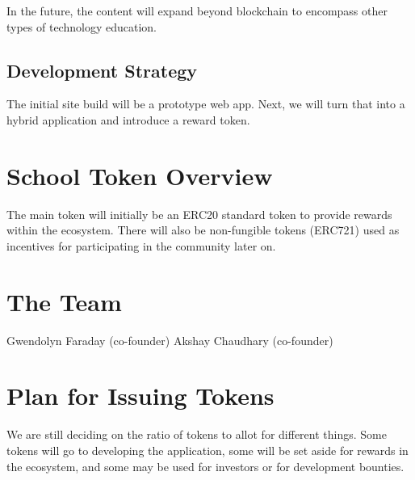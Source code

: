 \documentclass{article}
\begin{document}
  In the future, the content will expand beyond blockchain to encompass other types of technology education.

  \subsection{Development Strategy}

  The initial site build will be a prototype web app. Next, we will turn that into a hybrid application and introduce a reward token.

  \section{School Token Overview}

  The main token will initially be an ERC20 standard token to provide rewards within the ecosystem. There will also be non-fungible tokens (ERC721) used as incentives for participating in the community later on.

  \section{The Team}

  Gwendolyn Faraday (co-founder)
  Akshay Chaudhary (co-founder)

  \section{Plan for Issuing Tokens}

  We are still deciding on the ratio of tokens to allot for different things. Some tokens will go to developing the application, some will be set aside for rewards in the ecosystem, and some may be used for investors or for development bounties.
\end{document}
